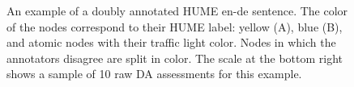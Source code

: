 \documentclass[11pt,letterpaper]{article}
\begin{document}
\begin{figure}[t]
\caption{An example of a doubly annotated HUME en-de sentence. The color of the nodes correspond to their
  HUME label: yellow (A), blue (B), and atomic nodes with their traffic light color. Nodes in which the annotators
  disagree are split in color. The scale at the bottom right shows a sample of 10 raw DA assessments
  for this example. }
\label{fig:humeeg}
\end{figure}
%
\end{document}
